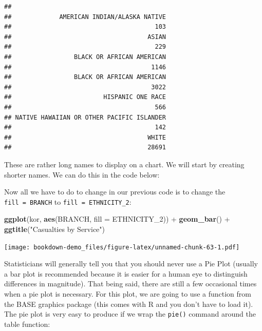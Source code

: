 \documentclass[]{book}
\newenvironment{Shaded}{\begin{snugshade}}{\end{snugshade}}
\newcommand{\KeywordTok}[1]{\textcolor[rgb]{0.13,0.29,0.53}{\textbf{{#1}}}}
\newcommand{\DataTypeTok}[1]{\textcolor[rgb]{0.13,0.29,0.53}{{#1}}}
\newcommand{\StringTok}[1]{\textcolor[rgb]{0.31,0.60,0.02}{{#1}}}
\newcommand{\NormalTok}[1]{{#1}}
\begin{document}
\begin{verbatim}
## 
##             AMERICAN INDIAN/ALASKA NATIVE 
##                                       103 
##                                     ASIAN 
##                                       229 
##                 BLACK OR AFRICAN AMERICAN 
##                                      1146 
##                 BLACK OR AFRICAN AMERICAN 
##                                      3022 
##                         HISPANIC ONE RACE 
##                                       566 
## NATIVE HAWAIIAN OR OTHER PACIFIC ISLANDER 
##                                       142 
##                                     WHITE 
##                                     28691
\end{verbatim}

These are rather long names to display on a chart. We will start by
creating shorter names. We can do this in the code below:

\begin{Shaded}
\end{Shaded}

Now all we have to do to change in our previous code is to change the
\texttt{fill\ =\ BRANCH} to \texttt{fill\ =\ ETHNICITY\_2}:

\begin{Shaded}
\begin{Highlighting}[]
\KeywordTok{ggplot}\NormalTok{(kor, }\KeywordTok{aes}\NormalTok{(BRANCH, }\DataTypeTok{fill =} \NormalTok{ETHNICITY_2)) +}\StringTok{ }\KeywordTok{geom_bar}\NormalTok{() +}\StringTok{ }
\StringTok{  }\KeywordTok{ggtitle}\NormalTok{(}\StringTok{"Casualties by Service"}\NormalTok{)}
\end{Highlighting}
\end{Shaded}

\texttt{[image: bookdown-demo\_files/figure-latex/unnamed-chunk-63-1.pdf]}

Statisticians will generally tell you that you should never use a Pie
Plot (usually a bar plot is recommended because it is easier for a human
eye to distinguish differences in magnitude). That being said, there are
still a few occasional times when a pie plot is necessary. For this
plot, we are going to use a function from the BASE graphics package
(this comes with R and you don't have to load it). The pie plot is very
easy to produce if we wrap the \texttt{pie()} command around the table
function:
\end{document}
